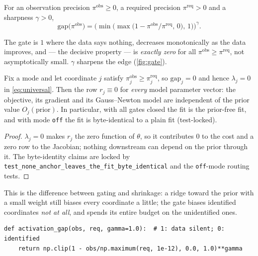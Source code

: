 \documentclass[11pt]{article}
\begin{document}
\begin{definition}
\label{def:gate}
For an observation precision $\pi^{\text{obs}}\ge0$, a required precision
$\pi^{\text{req}}>0$ and a sharpness $\gamma>0$,
\begin{equation}
\mathrm{gap}\big(\pi^{\text{obs}}\big)
=\Big(\min\big(\max\big(1-\pi^{\text{obs}}/\pi^{\text{req}},\,0\big),\,1\big)\Big)^{\gamma}.
\label{eq:gap}
\end{equation}
\end{definition}

The gate is $1$ where the data says nothing, decreases monotonically as the
data improves, and --- the decisive property --- is \emph{exactly zero} for
all $\pi^{\text{obs}}\ge\pi^{\text{req}}$, not asymptotically small.
$\gamma$ sharpens the edge (\cref{fig:gate}).

\begin{proposition}
\label{prop:nodamp}
Fix a mode and let coordinate $j$ satisfy
$\pi^{\text{obs}}_j\ge\pi^{\text{req}}_j$, so $\mathrm{gap}_j=0$ and hence
$\lambda_j=0$ in \eqref{eq:universal}. Then the row $r_j\equiv0$ for
\emph{every} model parameter vector: the objective, its gradient and its
Gauss--Newton model are independent of the prior value $O_j(\text{prior})$.
In particular, with all gates closed the fit is the prior-free fit, and with
mode \texttt{off} the fit is byte-identical to a plain fit (test-locked).
\end{proposition}

\begin{proof}
$\lambda_j=0$ makes $r_j$ the zero function of $\theta$, so it contributes
$0$ to the cost and a zero row to the Jacobian; nothing downstream can depend
on the prior through it. The byte-identity claims are locked by
\texttt{test\_none\_anchor\_leaves\_the\_fit\_byte\_identical} and the
\texttt{off}-mode routing tests.
\end{proof}

This is the difference between gating and shrinkage: a ridge toward the prior
with a small weight still biases every coordinate a little; the gate biases
identified coordinates \emph{not at all}, and spends its entire budget on the
unidentified ones.

\begin{lstlisting}[caption={The activation gate \eqref{eq:gap}, verbatim from
the shared vocabulary (\texttt{calib/precision.py}); matches production
exactly (\cref{app:ref}).},label={lst:gate}]
def activation_gap(obs, req, gamma=1.0):  # 1: data silent; 0: identified
    return np.clip(1 - obs/np.maximum(req, 1e-12), 0.0, 1.0)**gamma
\end{lstlisting}
\end{document}
